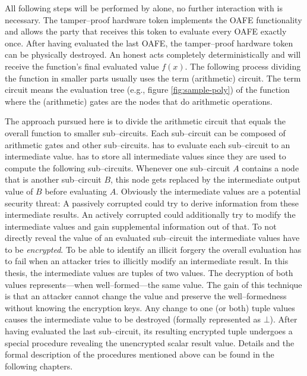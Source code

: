 All following steps will be performed by \JWpTwo{} alone, no further interaction
with \JWpOne{} is necessary. The tamper--proof hardware token implements the
OAFE functionality and allows the party that receives this token to evaluate
every OAFE exactly once. After having evaluated the last OAFE, the tamper--proof
hardware token can be physically destroyed. An honest \JWpTwo{} acts completely
deterministically and will receive the function's final evaluated value $f(x)$.
The following process dividing the function in smaller parts usually uses the
term (arithmetic) circuit. The term circuit means the evaluation tree (e.g.,
figure \ref{fig:sample-poly}) of the function where the (arithmetic) gates are
the nodes that do arithmetic operations.

The approach pursued here is to divide the arithmetic circuit that equals the
overall function to smaller sub--circuits. Each sub--circuit can be composed of
arithmetic gates and other sub--circuits. \JWpTwo{} has to evaluate each
sub--circuit to an intermediate value. \JWpTwo{} has to store all intermediate
values since they are used to compute the following sub--circuits.  Whenever one
sub--circuit $A$ contains a node that is another sub--circuit $B$, this node
gets replaced by the intermediate output value of $B$ before evaluating $A$.
Obviously the intermediate values are a potential security threat: A passively
corrupted \JWpTwo{} could try to derive information from these intermediate
results. An actively corrupted \JWpTwo{} could additionally try to modify the
intermediate values and gain supplemental information out of that. To not
directly reveal the value of an evaluated sub--circuit the intermediate values
have to be \emph{encrypted}. To be able to identify an illicit forgery the
overall evaluation has to fail when an attacker tries to illicitly modify an
intermediate result. In this thesis, the intermediate values are tuples of two
values. The decryption of both values represents---when well--formed---the same
value. The gain of this technique is that an attacker cannot change the value
and preserve the well--formedness without knowing the encryption keys. Any
change to one (or both) tuple values causes the intermediate value to be
destroyed (formally represented as $\bot$). After having evaluated the last
sub--circuit, its resulting encrypted tuple undergoes a special procedure
revealing the unencrypted scalar result value. Details and the formal
description of the procedures mentioned above can be found in the following
chapters.

